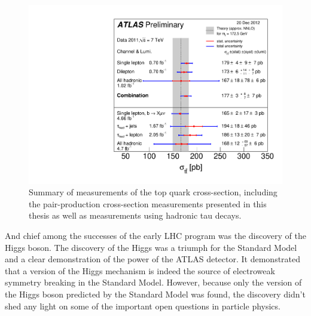 \begin{figure}[ht!]
  \begin{center}
    \includegraphics[width=.75\textwidth]{figures/conclusion/tt_xsec20Dec2012}
    \caption{Summary of measurements of the top quark cross-section, including the pair-production cross-section measurements presented in this thesis as well as measurements using hadronic tau decays.}
    \label{fig:xsec_vs_roots}
  \end{center}
\end{figure}
\clearpage

And chief among the successes of the early LHC program was the discovery of the Higgs boson\cite{HiggsObservation:2012}.
The discovery of the Higgs was a triumph for the Standard Model and a clear demonstration of the power of the ATLAS detector.
It demonstrated that a version of the Higgs mechanism is indeed the source of electroweak symmetry breaking in the Standard Model.
However, because only the version of the Higgs boson predicted by the Standard Model was found, the discovery didn't shed
any light on some of the important open questions in particle physics.

